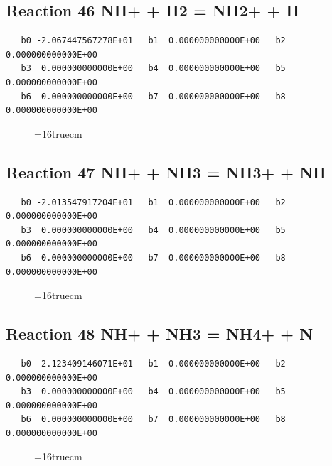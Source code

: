 \documentclass[12pt,dvipdfm]{article}
\begin{document}
\subsection{
Reaction 46 NH+ + H2 = NH2+ + H }
\begin{small}\begin{verbatim}
   b0 -2.067447567278E+01   b1  0.000000000000E+00   b2  0.000000000000E+00
   b3  0.000000000000E+00   b4  0.000000000000E+00   b5  0.000000000000E+00
   b6  0.000000000000E+00   b7  0.000000000000E+00   b8  0.000000000000E+00
\end{verbatim}\end{small}
\begin{figure}[h!] \label{n2rates}
\epsfxsize=16truecm
\end{figure}
\newpage

\subsection{
Reaction 47 NH+ + NH3 = NH3+ + NH }
\begin{small}\begin{verbatim}
   b0 -2.013547917204E+01   b1  0.000000000000E+00   b2  0.000000000000E+00
   b3  0.000000000000E+00   b4  0.000000000000E+00   b5  0.000000000000E+00
   b6  0.000000000000E+00   b7  0.000000000000E+00   b8  0.000000000000E+00
\end{verbatim}\end{small}
\begin{figure}[h!] \label{n2rates}
\epsfxsize=16truecm
\end{figure}
\newpage

\subsection{
Reaction 48 NH+ + NH3 = NH4+ + N }
\begin{small}\begin{verbatim}
   b0 -2.123409146071E+01   b1  0.000000000000E+00   b2  0.000000000000E+00
   b3  0.000000000000E+00   b4  0.000000000000E+00   b5  0.000000000000E+00
   b6  0.000000000000E+00   b7  0.000000000000E+00   b8  0.000000000000E+00
\end{verbatim}\end{small}
\begin{figure}[h!] \label{n2rates}
\epsfxsize=16truecm
\end{figure}
\newpage
\end{document}
